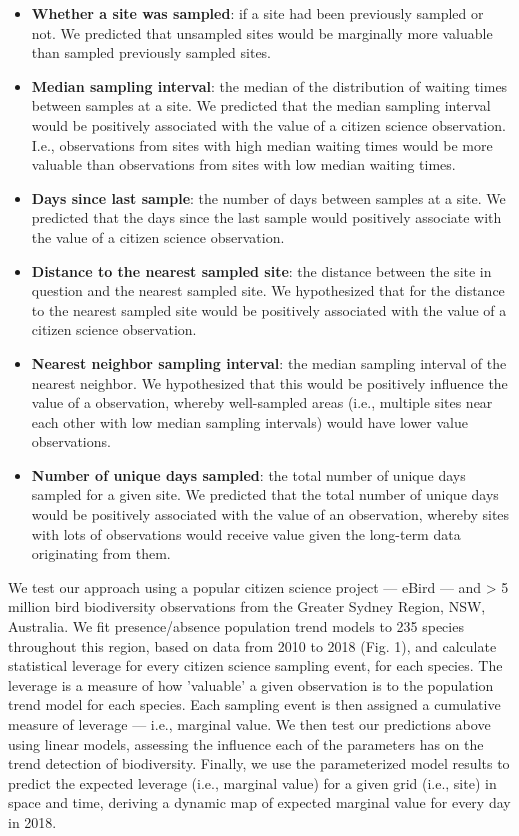 \documentclass[9pt,twocolumn,twoside,lineno]{pnas-new}
\begin{document}
\begin{itemize}
  \item \textbf{Whether a site was sampled}: if a site had been previously sampled or not. We predicted that unsampled sites would be marginally more valuable than sampled previously sampled sites.
  \item \textbf{Median sampling interval}: the median of the distribution of waiting times between samples at a site. We predicted that the median sampling interval would be positively associated with the value of a citizen science observation. I.e., observations from sites with high median waiting times would be more valuable than observations from sites with low median waiting times.
  \item \textbf{Days since last sample}: the number of days between samples at a site. We predicted that the days since the last sample would positively associate with the value of a citizen science observation.
  \item \textbf{Distance to the nearest sampled site}: the distance between the site in question and the nearest sampled site. We hypothesized that for the distance to the nearest sampled site would be positively associated with the value of a citizen science observation.
  \item \textbf{Nearest neighbor sampling interval}: the median sampling interval of the nearest neighbor. We hypothesized that this would be positively influence the value of a observation, whereby well-sampled areas (i.e., multiple sites near each other with low median sampling intervals) would have lower value observations.
  \item \textbf{Number of unique days sampled}: the total number of unique days sampled for a given site. We predicted that the total number of unique days would be positively associated with the value of an observation, whereby sites with lots of observations would receive value given the long-term data originating from them.
\end{itemize}

We test our approach using a popular citizen science project --- eBird \cite{sullivan2009ebird} --- and > 5 million bird biodiversity observations from the Greater Sydney Region, NSW, Australia. We fit presence/absence population trend models to 235 species throughout this region, based on data from 2010 to 2018 (Fig. 1), and calculate statistical leverage for every citizen science sampling event, for each species. The leverage is a measure of how 'valuable' a given observation is to the population trend model for each species. Each sampling event is then assigned a cumulative measure of leverage --- i.e., marginal value. We then test our predictions above using linear models, assessing the influence each of the parameters has on the trend detection of biodiversity. Finally, we use the parameterized model results to predict the expected leverage (i.e., marginal value) for a given grid (i.e., site) in space and time, deriving a dynamic map of expected marginal value for every day in 2018.
\end{document}
